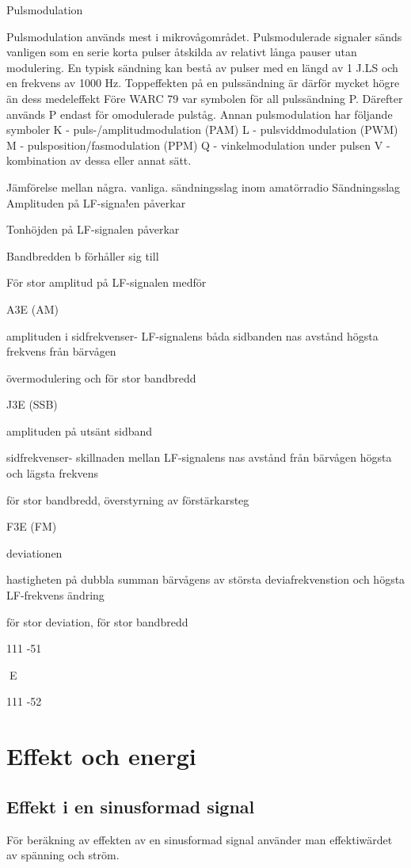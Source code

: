 Pulsmodulation

Pulsmodulation används mest i mikrovågområdet. Pulsmodulerade signaler sänds
vanligen som en serie korta pulser åtskilda
av relativt långa pauser utan modulering.
En typisk sändning kan bestå av pulser
med en längd av 1 J.LS och en frekvens av
1000 Hz. Toppeffekten på en pulssändning
är därför mycket högre än dess medeleffekt
Före WARC 79 var symbolen för all pulssändning P. Därefter används P endast för
omodulerade pulståg. Annan pulsmodulation
har följande symboler
K - puls-/amplitudmodulation (PAM)
L - pulsviddmodulation (PWM)
M - pulsposition/fasmodulation (PPM)
Q - vinkelmodulation under pulsen
V - kombination av dessa eller annat sätt.

Jämförelse mellan några. vanliga. sändningsslag inom amatörradio
Sändningsslag Amplituden på
LF-signa!en
påverkar

Tonhöjden på
LF-signalen
påverkar

Bandbredden b
förhåller sig till

För stor amplitud
på LF-signalen
medför

A3E (AM)

amplituden i
sidfrekvenser- LF-signalens
båda sidbanden nas avstånd
högsta frekvens
från bärvågen

övermodulering
och för stor bandbredd

J3E (SSB)

amplituden på
utsänt sidband

sidfrekvenser- skillnaden mellan
LF-signalens
nas avstånd
från bärvågen högsta och lägsta
frekvens

för stor bandbredd,
överstyrning av
förstärkarsteg

F3E (FM)

deviationen

hastigheten på dubbla summan
bärvågens
av största deviafrekvenstion och högsta
LF-frekvens
ändring

för stor deviation,
för stor bandbredd

111 -51

E

111 -52

\cleardoublepage

\section{Effekt och energi}

\subsection{Effekt i en sinusformad signal}
För beräkning av effekten av en sinusformad signal använder man effektiwärdet
av spänning och ström.

